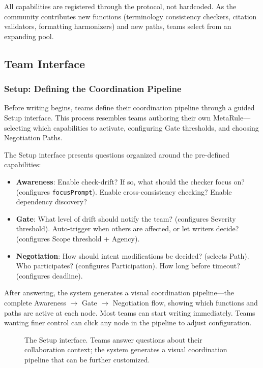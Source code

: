 All capabilities are registered through the protocol, not hardcoded. As the community contributes new functions (terminology consistency checkers, citation validators, formatting harmonizers) and new paths, teams select from an expanding pool.


\subsection{Team Interface}
\label{sec:team-interface}

\subsubsection{Setup: Defining the Coordination Pipeline}
\label{sec:setup}

Before writing begins, teams define their coordination pipeline through a guided Setup interface. This process resembles teams authoring their own MetaRule---selecting which capabilities to activate, configuring Gate thresholds, and choosing Negotiation Paths.

The Setup interface presents questions organized around the pre-defined capabilities:

\begin{itemize}[leftmargin=1.5em, itemsep=1pt]
\item \textbf{Awareness}: Enable check-drift? If so, what should the checker focus on? (configures \texttt{focusPrompt}). Enable cross-consistency checking? Enable dependency discovery?
\item \textbf{Gate}: What level of drift should notify the team? (configures Severity threshold). Auto-trigger when others are affected, or let writers decide? (configures Scope threshold + Agency).
\item \textbf{Negotiation}: How should intent modifications be decided? (selects Path). Who participates? (configures Participation). How long before timeout? (configures deadline).
\end{itemize}

\noindent After answering, the system generates a visual coordination pipeline---the complete Awareness $\rightarrow$ Gate $\rightarrow$ Negotiation flow, showing which functions and paths are active at each node. Most teams can start writing immediately. Teams wanting finer control can click any node in the pipeline to adjust configuration.

\begin{figure}[t]
\centering
{}
\caption{The Setup interface. Teams answer questions about their collaboration context; the system generates a visual coordination pipeline that can be further customized.}
\label{fig:setup}
\end{figure}



